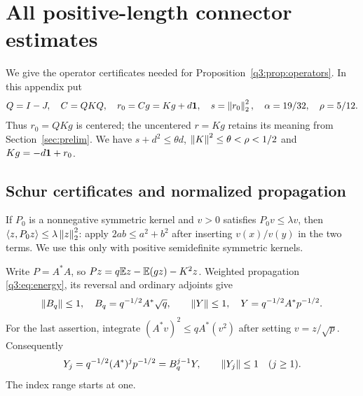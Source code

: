 \section{All positive-length connector estimates}\label{q3:app:operators}
We give the operator certificates needed for Proposition~\ref{q3:prop:operators}. In this appendix put
\[
 Q=I-J,\quad C=QKQ,\quad {r_0}=Cg=Kg+d\mathbf1,\quad s=\left\lVert r_0\right\rVert_2^2,
 \quad \alpha=19/32,\quad \rho=5/12 .
\]
Thus $r_0=QKg$ is centered; the uncentered $r=Kg$ retains its meaning from Section~\ref{sec:prelim}. We have $s+d^2\le\theta d$, $\left\lVert K\right\rVert^2\le\theta<\rho<1/2$ and $Kg=-d\mathbf1+{r_0}$.

\subsection{Schur certificates and normalized propagation}
If $P_0$ is a nonnegative symmetric kernel and $v>0$ satisfies $P_0v\le\lambda v$, then
$\left\langle z,P_0z\right\rangle\le\lambda\left\lVert z\right\rVert_2^2$: apply $2ab\le a^2+b^2$ after inserting $v(x)/v(y)$ in the two terms. We use this only with positive semidefinite symmetric kernels.

Write $P=A^*A$, so $Pz=q\mathbb E z-\mathbb E(gz)-K^2z$. Weighted propagation \eqref{q3:eq:energy}, its reversal and ordinary adjoints give
\[
 \left\lVert B_q\right\rVert\le1,\quad B_q=q^{-1/2}A^*\sqrt q,\qquad
 \left\lVert Y\right\rVert\le1,\quad Y=q^{-1/2}A^*p^{-1/2}.
\]
For the last assertion, integrate $(A^*v)^2\le qA^*(v^2)$ after setting $v=z/\sqrt p$. Consequently
\begin{equation}\label{q3:eq:normalizedpositive}
 Y_j=q^{-1/2}(A^*)^jp^{-1/2}=B_q^{j-1}Y,\qquad \left\lVert Y_j\right\rVert\le1\quad(j\ge1).
\end{equation}
The index range starts at one.

